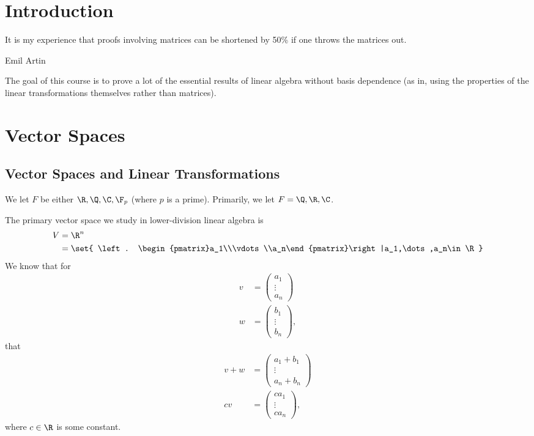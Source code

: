 \documentclass[10pt]{mypackage}
\begin{document}
\RaggedRight
\section{Introduction}%
\epigraph{It is my experience that proofs involving matrices can be shortened by 50\% if one throws the matrices out.}{Emil Artin}
The goal of this course is to prove a lot of the essential results of linear algebra without basis dependence (as in, using the properties of the linear transformations themselves rather than matrices).
\tableofcontents
\section{Vector Spaces}%
\subsection{Vector Spaces and Linear Transformations}
\begin{remark}
We let $F$ be either $\R,\Q,\C,\F_{p}$ (where $p$ is a prime). Primarily, we let $F = \Q,\R,\C$.
\end{remark}
\begin{example}
  The primary vector space we study in lower-division linear algebra is
  \begin{align*}
    V &= \R^n\\
      &= \set{ \left. \begin{pmatrix}a_1\\\vdots\\a_n\end{pmatrix}\right|a_1,\dots,a_n\in \R }
  \end{align*}
  We know that for
  \begin{align*}
    v &= \begin{pmatrix}a_1\\\vdots\\a_n\end{pmatrix}\\
    w &= \begin{pmatrix}b_1\\\vdots\\b_n\end{pmatrix},
  \end{align*}
  that
  \begin{align*}
    v+w &= \begin{pmatrix}a_1 + b_1\\\vdots\\a_n + b_n\end{pmatrix}\\
    cv &= \begin{pmatrix}ca_1 \\\vdots\\ca_n\end{pmatrix},
  \end{align*}
  where $c\in\R$ is some constant.
\end{example}
\end{document}
